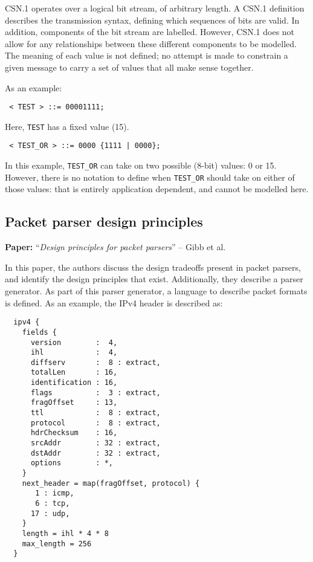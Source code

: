 \documentclass[10pt]{article}
\newcommand{\paper}[3]{\vspace{4mm}\noindent\textbf{Paper:} ``\textit{#1}'' -- #2 \cite{#3}\vspace{3mm}}
\begin{document}
CSN.1 operates over a logical bit stream, of arbitrary length. A CSN.1 definition
describes the transmission syntax, defining which sequences of bits are valid. In
addition, components of the bit stream are labelled. However, CSN.1 does not allow for any
relationships between these different components to be modelled. The meaning of each value
is not defined; no attempt is made to constrain a given message to carry a set of values
that all make sense together.

As an example:

\begin{verbatim} < TEST > ::= 00001111; \end{verbatim}

Here, \texttt{TEST} has a fixed value (15).

\begin{verbatim} < TEST_OR > ::= 0000 {1111 | 0000}; \end{verbatim}

In this example, \texttt{TEST\_OR} can take on two possible (8-bit) values: 0 or 15.
However, there is no notation to define when \texttt{TEST\_OR} should take on either of
those values: that is entirely application dependent, and cannot be modelled here.

\subsection{Packet parser design principles}
\paper{Design principles for packet parsers}{Gibb et al.}{gibb2013design}

In this paper, the authors discuss the design tradeoffs present in packet parsers, and
identify the design principles that exist. Additionally, they describe a parser generator.
As part of this parser generator, a language to describe packet formats is defined.
As an example, the IPv4 header is described as:

\begin{verbatim}
  ipv4 {
    fields {
      version        :  4,
      ihl            :  4,
      diffserv       :  8 : extract,
      totalLen       : 16,
      identification : 16,
      flags          :  3 : extract,
      fragOffset     : 13,
      ttl            :  8 : extract,
      protocol       :  8 : extract,
      hdrChecksum    : 16,
      srcAddr        : 32 : extract,
      dstAddr        : 32 : extract,
      options        : *,
    }
    next_header = map(fragOffset, protocol) {
       1 : icmp,
       6 : tcp,
      17 : udp,
    }
    length = ihl * 4 * 8
    max_length = 256
  }
\end{verbatim}
\end{document}
